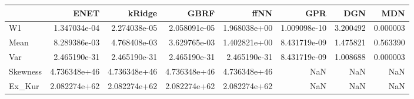 \begin{tabular}{lrrrrrrr}
\toprule
{} &          ENET &        kRidge &          GBRF &          ffNN &           GPR &       DGN &       MDN \\
\midrule
W1       &  1.347034e-04 &  2.274038e-05 &  2.058091e-05 &  1.968038e+00 &  1.009098e-10 &  3.200492 &  0.000003 \\
Mean     &  8.289386e-03 &  4.768408e-03 &  3.629765e-03 &  1.402821e+00 &  8.431719e-09 &  1.475821 &  0.563390 \\
Var      &  2.465190e-31 &  2.465190e-31 &  2.465190e-31 &  2.465190e-31 &  8.431719e-09 &  1.008688 &  0.000003 \\
Skewness &  4.736348e+46 &  4.736348e+46 &  4.736348e+46 &  4.736348e+46 &           NaN &       NaN &       NaN \\
Ex\_Kur   &  2.082274e+62 &  2.082274e+62 &  2.082274e+62 &  2.082274e+62 &           NaN &       NaN &       NaN \\
\bottomrule
\end{tabular}

